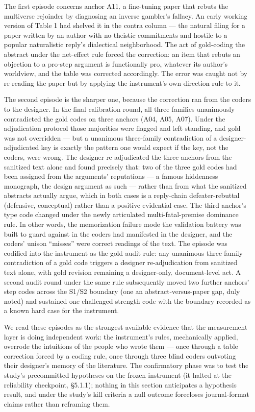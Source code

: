 The first episode concerns anchor A11, a fine-tuning paper that rebuts the multiverse rejoinder by diagnosing an inverse gambler's fallacy. An early working version of Table 1 had shelved it in the contra column --- the natural filing for a paper written by an author with no theistic commitments and hostile to a popular naturalistic reply's dialectical neighborhood. The act of gold-coding the abstract under the net-effect rule forced the correction: an item that rebuts an objection to a pro-step argument is functionally pro, whatever its author's worldview, and the table was corrected accordingly. The error was caught not by re-reading the paper but by applying the instrument's own direction rule to it.

The second episode is the sharper one, because the correction ran from the coders to the designer. In the final calibration round, all three families unanimously contradicted the gold codes on three anchors (A04, A05, A07). Under the adjudication protocol those majorities were flagged and left standing, and gold was not overridden --- but a unanimous three-family contradiction of a designer-adjudicated key is exactly the pattern one would expect if the key, not the coders, were wrong. The designer re-adjudicated the three anchors from the sanitized text alone and found precisely that: two of the three gold codes had been assigned from the arguments' reputations --- a famous hiddenness monograph, the design argument as such --- rather than from what the sanitized abstracts actually argue, which in both cases is a reply-chain defeater-rebuttal (defensive, conceptual) rather than a positive evidential case. The third anchor's type code changed under the newly articulated multi-fatal-premise dominance rule. In other words, the memorization failure mode the validation battery was built to guard against in the coders had manifested in the designer, and the coders' unison ``misses'' were correct readings of the text. The episode was codified into the instrument as the gold audit rule: any unanimous three-family contradiction of a gold code triggers a designer re-adjudication from sanitized text alone, with gold revision remaining a designer-only, document-level act. A second audit round under the same rule subsequently moved two further anchors' step codes across the S1/S2 boundary (one an abstract-versus-paper gap, duly noted) and sustained one challenged strength code with the boundary recorded as a known hard case for the instrument.

We read these episodes as the strongest available evidence that the measurement layer is doing independent work: the instrument's rules, mechanically applied, overrode the intuitions of the people who wrote them --- once through a table correction forced by a coding rule, once through three blind coders outvoting their designer's memory of the literature. The confirmatory phase was to test the study's precommitted hypotheses on the frozen instrument (it halted at the reliability checkpoint, \S{}5.1.1); nothing in this section anticipates a hypothesis result, and under the study's kill criteria a null outcome forecloses journal-format claims rather than reframing them.

